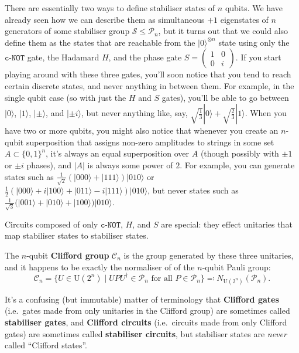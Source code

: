 \documentclass[fleqn]{article}
\newenvironment{idea}{\noindent}{\medskip}
\begin{document}
There are essentially two ways to define stabiliser states of \(n\) qubits.
We have already seen how we can describe them as simultaneous \(+1\) eigenstates of \(n\) generators of some stabiliser group \(\mathcal{S}\leqslant\mathcal{P}_n\), but it turns out that we could also define them as the states that are reachable from the \(|0\rangle^{\otimes n}\) state using only the \(\texttt{c-NOT}\) gate, the Hadamard \(H\), and the phase gate \(S=\left(\begin{smallmatrix}1&0\\0&i\end{smallmatrix}\right)\).
If you start playing around with these three gates, you'll soon notice that you tend to reach certain discrete states, and never anything in between them.
For example, in the single qubit case (so with just the \(H\) and \(S\) gates), you'll be able to go between \(|0\rangle\), \(|1\rangle\), \(|\pm\rangle\), and \(|\pm i\rangle\), but never anything like, say, \(\sqrt{\frac{1}{3}}|0\rangle+\sqrt{\frac{2}{3}}|1\rangle\).
When you have two or more qubits, you might also notice that whenever you create an \(n\)-qubit superposition that assigns non-zero amplitudes to strings in some set \(A\subset\{0,1\}^n\), it's always an equal superposition over \(A\) (though possibly with \(\pm1\) or \(\pm i\) phases), and \(|A|\) is always some power of \(2\).
For example, you can generate states such as \(\frac{1}{\sqrt{2}}(|000\rangle+|111\rangle)|010\rangle\) or \(\frac{1}{2}(|000\rangle+i|100\rangle+|011\rangle-i|111\rangle)|010\rangle\), but never states such as \(\frac{1}{\sqrt{3}}(|001\rangle+|010\rangle+|100\rangle)|010\rangle\).

\begin{idea}
Circuits composed of only \(\texttt{c-NOT}\), \(H\), and \(S\) are special: they effect unitaries that map stabiliser states to stabiliser states.

The \(n\)-qubit \textbf{Clifford group} \(\mathcal{C}_n\) is the group generated by these three unitaries, and it happens to be exactly the normaliser of of the \(n\)-qubit Pauli group:
\[
  \mathcal{C}_n = \{U\in\mathrm{U}(2^n) \mid UPU^\dagger\in\mathcal{P}_n\text{ for all }P\in\mathcal{P}_n\} \eqqcolon N_{\mathrm{U}(2^n)}(\mathcal{P}_n).
\]

\end{idea}

It's a confusing (but immutable) matter of terminology that \textbf{Clifford gates} (i.e.~gates made from only unitaries in the Clifford group) are sometimes called \textbf{stabiliser gates}, and \textbf{Clifford circuits} (i.e.~circuits made from only Clifford gates) are sometimes called \textbf{stabiliser circuits}, but stabiliser states are \emph{never} called ``Clifford states''.
\end{document}
